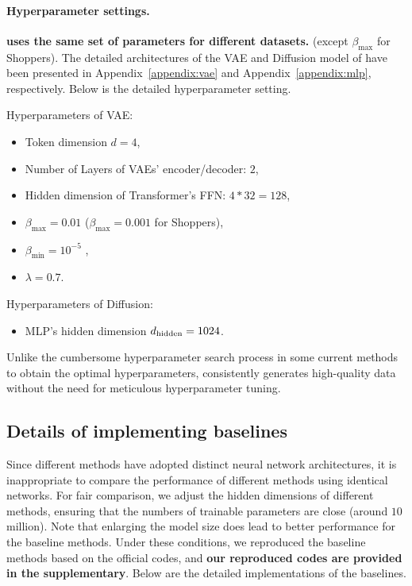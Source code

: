 \paragraph{Hyperparameter settings.} \textbf{\modelname uses the same set of parameters for different datasets.} (except $\beta_{\max}$ for Shoppers). The detailed architectures of the VAE and Diffusion model of \modelname have been presented in Appendix~\ref{appendix:vae} and Appendix~\ref{appendix:mlp}, respectively.
Below is the detailed hyperparameter setting.

Hyperparameters of VAE:
\begin{itemize}
    \item Token dimension $d = 4$,
    \item Number of Layers of VAEs' encoder/decoder: $2$,
    \item Hidden dimension of Transformer's FFN: $4 * 32 = 128$,
    \item $\beta_{\max} = 0.01$ ($\beta_{\max} = 0.001$ for Shoppers),
    \item $\beta_{\min} = 10^{-5}$ , 
    \item $\lambda = 0.7$.
\end{itemize}

Hyperparameters of Diffusion:
\begin{itemize}
    \item MLP's hidden dimension $d_{\rm hidden} = 1024$.
\end{itemize}

Unlike the cumbersome hyperparameter search process in some current methods~\citep{tabddpm, stasy, codi} to obtain the optimal hyperparameters, \modelname consistently generates high-quality data without the need for meticulous hyperparameter tuning. 
 
\subsection{Details of implementing baselines}
Since different methods have adopted distinct neural network architectures, it is inappropriate to compare the performance of different methods using identical networks. For fair comparison, we adjust the hidden dimensions of different methods, ensuring that the numbers of trainable parameters are close (around $10$ million). Note that enlarging the model size does lead to better performance for the baseline methods. Under these conditions, we reproduced the baseline methods based on the official codes, and \textbf{our reproduced codes are provided in the supplementary}. Below are the detailed implementations of the baselines.

